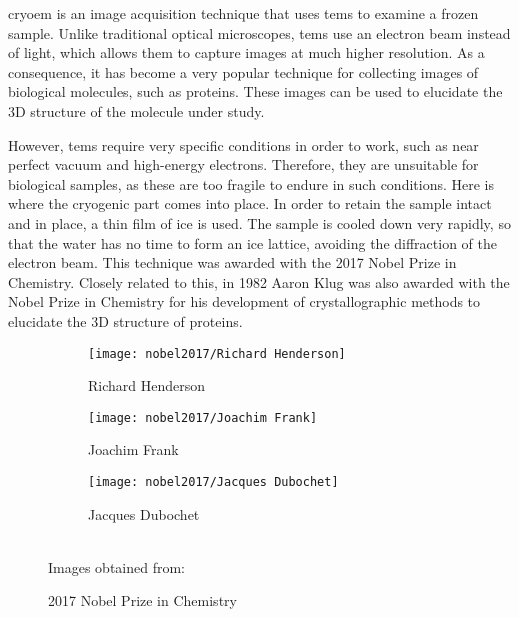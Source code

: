 \documentclass[../main.tex]{subfiles}
\begin{document}
\gls{cryoem} is an image acquisition technique that uses \glspl{tem} to examine a frozen sample. Unlike traditional optical microscopes, \glspl{tem} use an electron beam instead of light, which allows them to capture images at much higher resolution. As a consequence, it has become a very popular technique for collecting images of biological molecules, such as proteins\cite{chemistry_world_cryoem}. These images can be used to elucidate the 3D structure of the molecule under study.

However, \glspl{tem} require very specific conditions in order to work, such as near perfect vacuum and high-energy electrons. Therefore, they are unsuitable for biological samples, as these are too fragile to endure in such conditions. Here is where the cryogenic part comes into place. In order to retain the sample intact and in place, a thin film of ice is used. The sample is cooled down very rapidly, so that the water has no time to form an ice lattice, avoiding the diffraction of the electron beam. This technique was awarded with the 2017 Nobel Prize in Chemistry\cite{chemistry_world_cryoem}\cite{nobel2017}. Closely related to this, in 1982 Aaron Klug was also awarded with the Nobel Prize in Chemistry for his development of crystallographic methods to elucidate the 3D structure of proteins\cite{nobel1982}.

\begin{figure}[htbp]
    \centering
    \begin{subfigure}[b]{0.3\textwidth}
         \centering
         \texttt{[image: nobel2017/Richard Henderson]}
         \caption{Richard Henderson}
         \label{fig:1:nobel2017:richard}
    \end{subfigure}
    \hfill
    \begin{subfigure}[b]{0.3\textwidth}
         \centering
         \texttt{[image: nobel2017/Joachim Frank]}
         \caption{Joachim Frank}
         \label{fig:1:nobel2017:joachim}
    \end{subfigure}
    \hfill
    \begin{subfigure}[b]{0.3\textwidth}
         \centering
         \texttt{[image: nobel2017/Jacques Dubochet]}
         \caption{Jacques Dubochet}
         \label{fig:1:nobel2017:jaques}
    \end{subfigure}\\
    Images obtained from: \cite{science_nobel}
    \caption{2017 Nobel Prize in Chemistry}
    \label{fig:1:nobel2017}
\end{figure}
\end{document}
